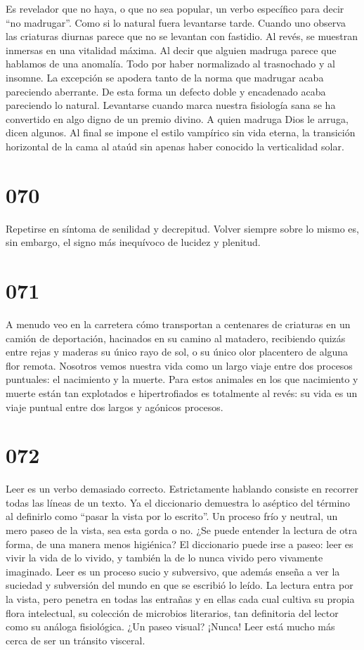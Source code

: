 \documentclass[a4paper,11pt,openright,twocolumn]{book}
\begin{document}
Es revelador que no haya, o que no sea popular, un verbo específico para decir ``no madrugar''. Como si lo natural fuera levantarse tarde. Cuando uno observa las criaturas diurnas parece que no se levantan con fastidio. Al revés, se muestran inmersas en una vitalidad máxima. Al decir que alguien madruga parece que hablamos de una anomalía. Todo por haber normalizado al trasnochado y al insomne. La excepción se apodera tanto de la norma que madrugar acaba pareciendo aberrante. De esta forma un defecto doble y encadenado acaba pareciendo lo natural. Levantarse cuando marca nuestra fisiología sana se ha convertido en algo digno de un premio divino. A quien madruga Dios le arruga, dicen algunos. Al final se impone el estilo vampírico sin vida eterna, la transición horizontal de la cama al ataúd sin apenas haber conocido la verticalidad solar.

\section*{070}

Repetirse en síntoma de senilidad y decrepitud. Volver siempre sobre lo mismo es, sin embargo, el signo más inequívoco de lucidez y plenitud. 

\section*{071}

A menudo veo en la carretera cómo transportan a centenares de criaturas en un camión de deportación, hacinados en su camino
al matadero, recibiendo quizás entre rejas y maderas su único rayo de sol, o su único olor placentero de alguna flor remota.
 Nosotros vemos nuestra vida como un largo viaje entre dos procesos puntuales: el nacimiento y la muerte.
Para estos animales en los que nacimiento y muerte están tan explotados e hipertrofiados es totalmente al revés: su vida es un viaje puntual
entre dos largos y agónicos procesos. 

\section*{072}

Leer es un verbo demasiado correcto. Estrictamente hablando consiste en recorrer
todas las líneas de un texto. Ya el diccionario demuestra lo aséptico del término al definirlo como ``pasar la vista
por lo escrito''. Un proceso frío y neutral, un mero paseo de la vista, sea esta gorda o no. ¿Se puede entender la 
lectura de otra forma, de una manera menos higiénica? El diccionario puede irse a paseo: leer es vivir la vida de lo vivido,
y también la de lo nunca vivido pero vivamente imaginado. Leer es un proceso sucio y subversivo, que además enseña
a ver la suciedad y subversión del mundo en que se escribió lo leído. La lectura entra por la vista, pero penetra en todas las 
entrañas y en ellas cada cual cultiva su propia flora intelectual, su colección de microbios literarios, tan definitoria
del lector como su análoga fisiológica. ¿Un paseo visual? ¡Nunca! Leer está mucho más cerca de ser un tránsito visceral.
\end{document}
